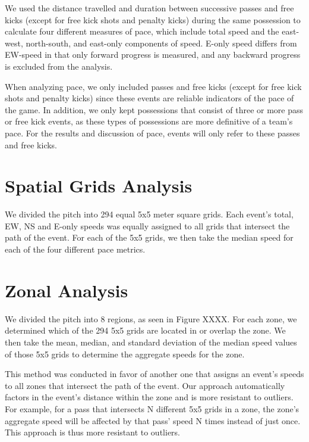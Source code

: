 \documentclass[]{book}
\begin{document}
We used the distance travelled and duration between successive passes and free kicks (except for free kick shots and penalty kicks) during the same possession to calculate four different measures of pace, which include total speed and the east-west, north-south, and east-only components of speed. E-only speed differs from EW-speed in that only forward progress is measured, and any backward progress is excluded from the analysis.

When analyzing pace, we only included passes and free kicks (except for free kick shots and penalty kicks) since these events are reliable indicators of the pace of the game. In addition, we only kept possessions that consist of three or more pass or free kick events, as these types of possessions are more definitive of a team's pace. For the results and discussion of pace, events will only refer to these passes and free kicks.

\hypertarget{spatial-grids-analysis}{%
\section{Spatial Grids Analysis}\label{spatial-grids-analysis}}

We divided the pitch into 294 equal 5x5 meter square grids. Each event's total, EW, NS and E-only speeds was equally assigned to all grids that intersect the path of the event. For each of the 5x5 grids, we then take the median speed for each of the four different pace metrics.

\hypertarget{zonal-analysis}{%
\section{Zonal Analysis}\label{zonal-analysis}}

We divided the pitch into 8 regions, as seen in Figure XXXX. For each zone, we determined which of the 294 5x5 grids are located in or overlap the zone. We then take the mean, median, and standard deviation of the median speed values of those 5x5 grids to determine the aggregate speeds for the zone.

This method was conducted in favor of another one that assigns an event's speeds to all zones that intersect the path of the event. Our approach automatically factors in the event's distance within the zone and is more resistant to outliers. For example, for a pass that intersects N different 5x5 grids in a zone, the zone's aggregate speed will be affected by that pass' speed N times instead of just once. This approach is thus more resistant to outliers.
\end{document}

